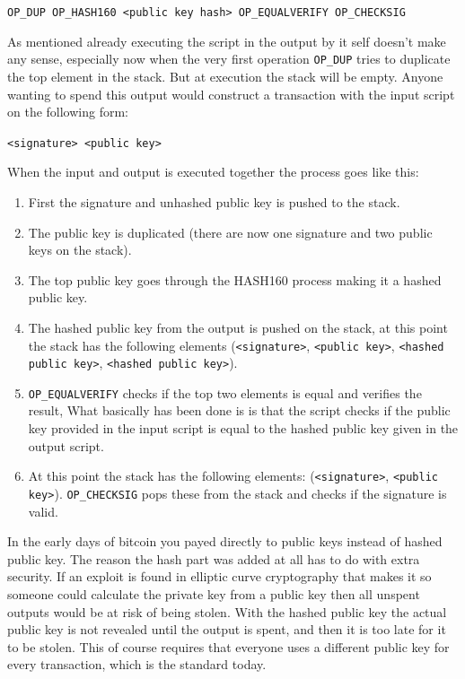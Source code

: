 \texttt{OP\_DUP OP\_HASH160 <public key hash> OP\_EQUALVERIFY OP\_CHECKSIG}

As mentioned already executing the script in the output by it self doesn't make any sense, especially now when the very first operation \texttt{OP\_DUP} tries to duplicate the top element in the stack. But at execution the stack will be empty. Anyone wanting to spend this output would construct a transaction with the input script on the following form:

\texttt{<signature> <public key>}

When the input and output is executed together the process goes like this: 
\begin{enumerate}
	\item First the signature and unhashed public key is pushed to the stack.
	\item The public key is duplicated (there are now one signature and two public keys on the stack).
	\item The top public key goes through the HASH160 process making it a hashed public key.
	\item The hashed public key from the output is pushed on the stack, at this point the stack has the following elements (\texttt{<signature>}, \texttt{<public key>}, \texttt{<hashed public key>}, \texttt{<hashed public key>}).
	\item \texttt{OP\_EQUALVERIFY} checks if the top two elements is equal and verifies the result, What basically has been done is is that the script checks if the public key provided in the input script is equal to the hashed public key given in the output script.
	\item At this point the stack has the following elements: (\texttt{<signature>}, \texttt{<public key>}). \texttt{OP\_CHECKSIG} pops these from the stack and checks if the signature is valid.
\end{enumerate}

In the early days of bitcoin you payed directly to public keys instead of hashed public key. The reason the hash part was added at all has to do with extra security. If an exploit is found in elliptic curve cryptography that makes it so someone could calculate the private key from a public key then all unspent outputs would be at risk of being stolen. With the hashed public key the actual public key is not revealed until the output is spent, and then it is too late for it to be stolen. This of course requires that everyone uses a different public key for every transaction, which is the standard today.

